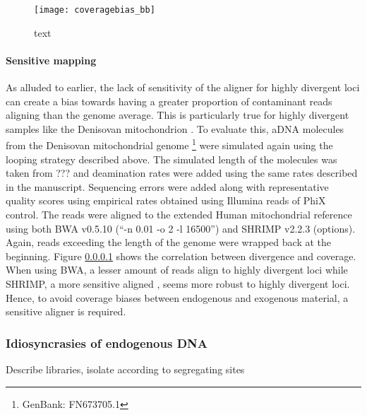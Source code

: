 \documentclass[a4paper,12pt]{article}
\begin{document}
\begin{figure}[H]
\centering
\texttt{[image: coveragebias\_bb]}
\label{fig:coveragebias}
\caption{text}
\end{figure}


\paragraph{Sensitive mapping}

As alluded to earlier, the lack of sensitivity of the aligner for highly divergent loci can create a bias towards having a greater proportion of contaminant reads aligning than the genome average. This is particularly true for highly divergent samples like the Denisovan mitochondrion \cite{krause2010complete}. To evaluate this, aDNA molecules from the Denisovan mitochondrial genome \footnote{GenBank: FN673705.1} were simulated again using the looping strategy described above. The simulated length of the molecules was taken from ??? and deamination rates were added using the same rates described in the manuscript. Sequencing errors were added along with representative quality scores using empirical rates obtained using Illumina reads of PhiX control. The reads were aligned to the extended Human mitochondrial reference using both BWA v0.5.10 (``-n 0.01 -o 2 -l 16500'') and SHRIMP v2.2.3\cite{david2011shrimp2} (options). Again, reads exceeding the length of the genome were wrapped back at the beginning. Figure \ref{} shows the correlation between divergence and coverage. When using BWA, a lesser amount of reads align to highly divergent loci while SHRIMP, a more sensitive aligned \cite{comparison}, seems more robust to highly divergent loci. Hence, to avoid coverage biases between endogenous and exogenous material, a sensitive aligner is required.





















\subsubsection{Idiosyncrasies of endogenous DNA}
\label{seq:endodeampattern}
Describe libraries, isolate according to segregating sites
\end{document}
